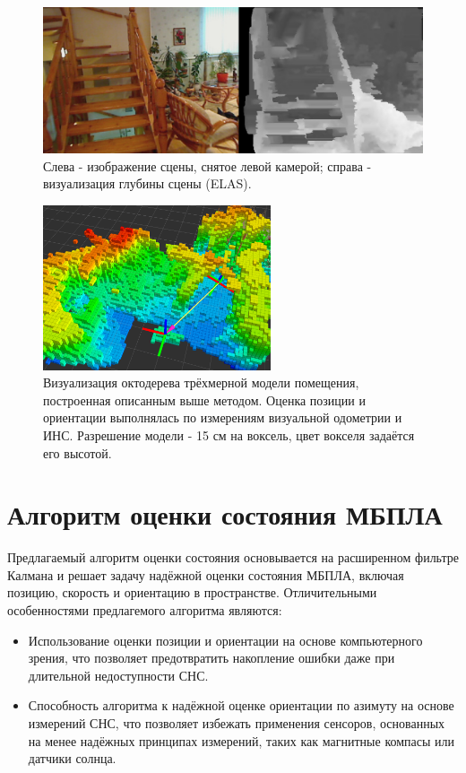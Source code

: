 \documentclass[11pt,a4paper]{article}
\begin{document}
\begin{figure}[!htbp]
    \centering
    \includegraphics[width=1\textwidth]{disparity.jpg}
    \caption{\label{fig:disparity}Слева - изображение сцены, снятое левой камерой; справа - визуализация глубины сцены (ELAS).}
\end{figure}

\begin{figure}[!htbp]
    \centering
    \includegraphics[width=0.6\textwidth]{octomap.png}
    \caption{\label{fig:octomap}Визуализация октодерева трёхмерной модели помещения, построенная описанным выше методом. Оценка позиции и ориентации выполнялась по измерениям визуальной одометрии и ИНС. Разрешение модели - 15 см на воксель, цвет вокселя задаётся его высотой.}
\end{figure}

\section{Алгоритм оценки состояния МБПЛА}

Предлагаемый алгоритм оценки состояния основывается на расширенном фильтре Калмана и решает задачу надёжной оценки состояния МБПЛА, включая позицию, скорость и ориентацию в пространстве. Отличительными особенностями предлагемого алгоритма являются:

\begin{itemize}
    \item Использование оценки позиции и ориентации на основе компьютерного зрения, что позволяет предотвратить накопление ошибки даже при длительной недоступности СНС.
    \item Способность алгоритма к надёжной оценке ориентации по азимуту на основе измерений СНС, что позволяет избежать применения сенсоров, основанных на менее надёжных принципах измерений, таких как магнитные компасы или датчики солнца.
\end{itemize}
\end{document}
